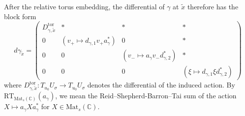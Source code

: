 \documentclass[11pt]{amsart}
\theoremstyle{plain}
\theoremstyle{definition}
\numberwithin{equation}{section}
\newcommand{\bbC}{\mathbb{C}}
\newcommand{\Mat}{\mathrm{Mat}}
\begin{document}
After the relative torus embedding,
the differential of $\gamma$ at $\widetilde{x}$
therefore has the block form
\begin{equation}\label{equation_action_d_gamma}
d\gamma_{\widetilde x}=
\begin{pmatrix}
D^{\mathrm{tor}}_{\gamma,\widetilde x}&*&*&*\\
0&(v_+\mapsto d_{\gamma,1}v_+a_\gamma^*)&0&*\\
0&0&(v_-\mapsto a_\gamma v_-d_{\gamma,2}^*)&*\\
0&0&0&(\xi\mapsto d_{\gamma,1}\xi d_{\gamma,2}^*)
\end{pmatrix}
\end{equation}
where $D^{\mathrm{tor}}_{\gamma,\tilde{x}}\colon
T_{u_0}U_\sigma\to T_{u_0}U_\sigma$
denotes the differential of the induced action.
By $\mathrm{RT}_{\Mat_s(\bbC)}(a_\gamma)$, we mean the Reid--Shepherd-Barron--Tai sum of the action $X \mapsto a_\gamma X a_\gamma^*$ for $X \in \Mat_s(\bbC)$.
\end{document}

